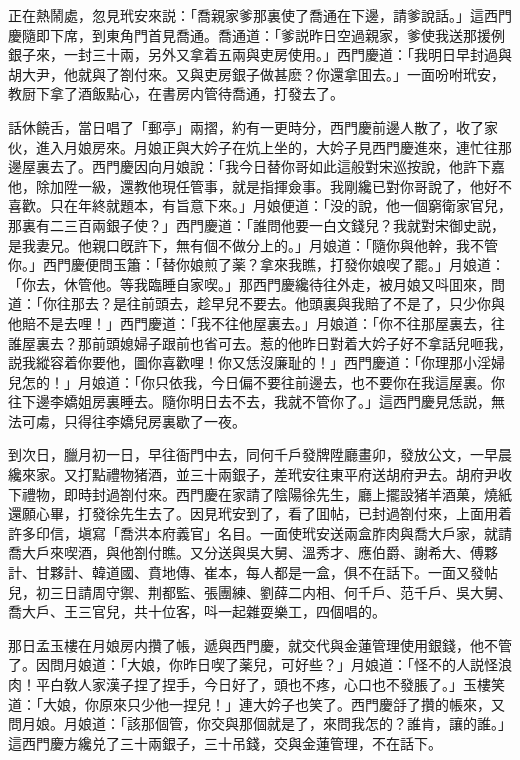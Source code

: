 正在熱鬧處，忽見玳安來説：「喬親家爹那裏使了喬通在下邊，請爹說話。」這西門慶隨即下席，到東角門首見喬通。喬通道：「爹説昨日空過親家，爹使我送那援例銀子來，一封三十兩，另外又拿着五兩與吏房使用。」西門慶道：「我明日早封過與胡大尹，他就與了劄付來。又與吏房銀子做甚麽？你還拿囬去。」一面吩咐玳安，教厨下拿了酒飯點心，在書房内管待喬通，打發去了。

話休饒舌，當日唱了「郵亭」兩摺，約有一更時分，西門慶前邊人散了，收了家伙，進入月娘房來。月娘正與大妗子在炕上坐的，大妗子見西門慶進來，連忙往那邊屋裏去了。西門慶因向月娘說：「我今日替你哥如此這般對宋巡按說，他許下嘉他，除加陞一級，還教他現任管事，就是指揮僉事。我剛纔已對你哥說了，他好不喜歡。只在年終就題本，有旨意下來。」月娘便道：「没的說，他一個窮衛家官兒，那裏有二三百兩銀子使？」西門慶道：「誰問他要一白文錢兒？我就對宋御史説，是我妻兄。他親口旣許下，無有個不做分上的。」月娘道：「隨你與他幹，我不管你。」西門慶便問玉簫：「替你娘煎了薬？拿來我瞧，打發你娘喫了罷。」月娘道：「你去，休管他。等我臨睡自家喫。」那西門慶纔待往外走，被月娘又呌囬來，問道：「你往那去？是往前頭去，趁早兒不要去。他頭裏與我賠了不是了，只少你與他賠不是去哩！」西門慶道：「我不往他屋裏去。」月娘道：「你不往那屋裏去，往誰屋裏去？那前頭媳婦子跟前也省可去。惹的他昨日對着大妗子好不拿話兒咂我，説我縱容着你要他，圖你喜歡哩！你又恁沒廉耻的！」西門慶道：「你理那小淫婦兒怎的！」月娘道：「你只依我，今日偏不要往前邊去，也不要你在我這屋裏。你往下邊李嬌姐房裏睡去。隨你明日去不去，我就不管你了。」這西門慶見恁説，無法可䖏，只得往李嬌兒房裏歇了一夜。

到次日，臘月初一日，早往衙門中去，同何千戶發牌陞廳畫卯，發放公文，一早晨纔來家。又打點禮物猪酒，並三十兩銀子，差玳安往東平府送胡府尹去。胡府尹收下禮物，即時封過劄付來。西門慶在家請了陰陽徐先生，廳上擺設猪羊酒菓，燒紙還願心畢，打發徐先生去了。因見玳安到了，看了囬帖，已封過劄付來，上面用着許多印信，塡寫「喬洪本府義官」名目。一面使玳安送兩盒胙肉與喬大戶家，就請喬大戶來喫酒，與他劄付瞧。又分送與吳大舅、溫秀才、應伯爵、謝希大、傅夥計、甘夥計、韓道國、賁地傳、崔本，每人都是一盒，俱不在話下。一面又發帖兒，初三日請周守禦、荆都監、張團練、劉薛二内相、何千戶、范千戶、吳大舅、喬大戶、王三官兒，共十位客，呌一起雜耍樂工，四個唱的。

那日孟玉樓在月娘房内攢了帳，遞與西門慶，就交代與金蓮管理使用銀錢，他不管了。因問月娘道：「大娘，你昨日喫了薬兒，可好些？」月娘道：「怪不的人説怪浪肉！平白敎人家漢子捏了捏手，今日好了，頭也不疼，心口也不發脹了。」玉樓笑道：「大娘，你原來只少他一捏兒！」連大妗子也笑了。西門慶㧱了攢的帳來，又問月娘。月娘道：「該那個管，你交與那個就是了，來問我怎的？誰肯，讓的誰。」這西門慶方纔兑了三十兩銀子，三十吊錢，交與金蓮管理，不在話下。

